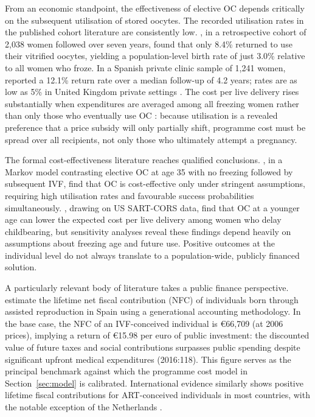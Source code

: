 \documentclass[12pt,a4paper]{article}
\begin{document}
From an economic standpoint, the effectiveness of elective OC depends
critically on the subsequent utilisation of stored oocytes. The
recorded utilisation rates in the published cohort literature are
consistently low. \citet{yang2022}, in a retrospective cohort of 2,038
women followed over seven years, found that only 8.4\% returned to use
their vitrified oocytes, yielding a population-level birth rate of just
3.0\% relative to all women who froze. In a Spanish private clinic
sample of 1,241 women, \citet{cobo2018} reported a 12.1\% return rate
over a median follow-up of 4.2 years; rates are as low as 5\% in
United Kingdom private settings \citep{trokoudes2011}. The cost per
live delivery rises substantially when expenditures are averaged among
all freezing women rather than only those who eventually use OC
\citep{yang2022}: because utilisation is a revealed preference that a
price subsidy will only partially shift, programme cost must be spread
over all recipients, not only those who ultimately attempt a pregnancy.

The formal cost-effectiveness literature reaches qualified conclusions.
\citet{loendersloot2011}, in a Markov model contrasting elective OC at
age 35 with no freezing followed by subsequent IVF, find that OC is
cost-effective only under stringent assumptions, requiring high
utilisation rates and favourable success probabilities simultaneously.
\citet{bakkensen2022}, drawing on US SART-CORS data, find that OC at a
younger age can lower the expected cost per live delivery among women
who delay childbearing, but sensitivity analyses reveal these findings
depend heavily on assumptions about freezing age and future use.
Positive outcomes at the individual level do not always translate to a
population-wide, publicly financed solution.

A particularly relevant body of literature takes a public finance
perspective. \citet{matorras2016} estimate the lifetime net fiscal
contribution (NFC) of individuals born through assisted reproduction in
Spain using a generational accounting methodology. In the base case,
the NFC of an IVF-conceived individual is \euro{}66,709 (at 2006
prices), implying a return of \euro{}15.98 per euro of public
investment: the discounted value of future taxes and social
contributions surpasses public spending despite significant upfront
medical expenditures (2016:118). This figure serves as the principal
benchmark against which the programme cost model in
Section~\ref{sec:model} is calibrated. International evidence
similarly shows positive lifetime fiscal contributions for ART-conceived
individuals in most countries, with the notable exception of the
Netherlands \citep{moolenaar2014}.
\end{document}
